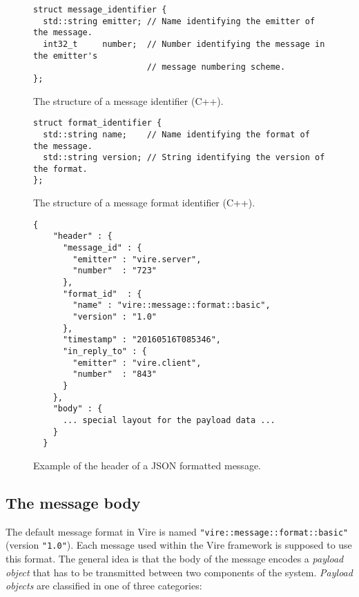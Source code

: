 \begin{figure}[h]
\vskip 10pt
\small
\begin{Verbatim}[frame=single,xleftmargin=0.cm,label=\fbox{C++}]
struct message_identifier {
  std::string emitter; // Name identifying the emitter of the message.
  int32_t     number;  // Number identifying the message in the emitter's
                       // message numbering scheme.
};
\end{Verbatim}
\normalsize
\caption{The      structure      of     a      message      identifier
  (C++).}\label{fig-app-json-message_id}
\end{figure}

\begin{figure}[h]
\vskip 10pt
\small
\begin{Verbatim}[frame=single,xleftmargin=0.cm,label=\fbox{C++}]
struct format_identifier {
  std::string name;    // Name identifying the format of the message.
  std::string version; // String identifying the version of the format.
};
\end{Verbatim}
\normalsize
\caption{The structure of a message format identifier (C++).}\label{fig-app-json-format_id}
\end{figure}


\begin{figure}[h]
\vskip 10pt
\small
\begin{Verbatim}[frame=single,xleftmargin=0.cm,label=\fbox{\texttt{JSON}}]
  {
    "header" : {
      "message_id" : {
        "emitter" : "vire.server",
        "number"  : "723"
      },
      "format_id"  : {
        "name" : "vire::message::format::basic",
        "version" : "1.0"
      },
      "timestamp" : "20160516T085346",
      "in_reply_to" : {
        "emitter" : "vire.client",
        "number"  : "843"
      }
    },
    "body" : {
      ... special layout for the payload data ...
    }
  }
\end{Verbatim}
\normalsize
\caption{Example    of    the    header   of    a    JSON    formatted
  message.}\label{fig-app-json-example-message}
\end{figure}


\clearpage

\subsection{The message body}

The     default     message     format    in     Vire     is     named
\texttt{"vire::message::format::basic"}    (version   \texttt{"1.0"}).
Each message  used within the Vire  framework is supposed to  use this
format.  The  general idea is that  the body of the  message encodes a
\emph{payload  object}   that  has  to  be   transmitted  between  two
components of  the system.   \emph{Payload objects} are  classified in
one of three categories:

